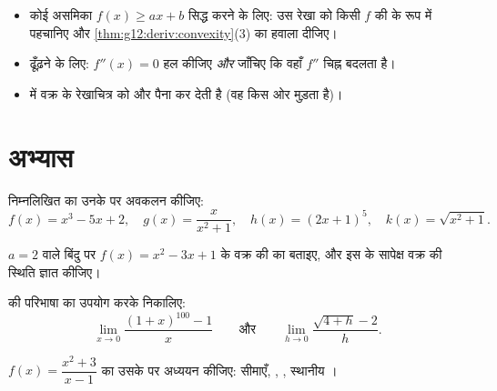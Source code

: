 \begin{method}\label{met:g12:deriv:convexity}
\begin{itemize}
  \item कोई असमिका $f(x) \geq ax + b$ सिद्ध करने के लिए: उस रेखा को किसी  $f$ की
         के रूप में पहचानिए और \cref{thm:g12:deriv:convexity}(3) का हवाला दीजिए।
  \item {} ढूँढ़ने के लिए: $f''(x) = 0$ हल कीजिए \emph{और} जाँचिए
        कि वहाँ $f''$ चिह्न बदलता है।
  \item {} में  वक्र के रेखाचित्र को और पैना कर देती है
        (वह किस ओर मुड़ता है)।
\end{itemize}
\end{method}

\section{अभ्यास}

\begin{exercise}[$\star$]\label{exo:g12:deriv:1}
निम्नलिखित  का उनके  पर अवकलन कीजिए:
\[
f(x) = x^3 - 5x + 2, \quad
g(x) = \frac{x}{x^2+1}, \quad
h(x) = (2x+1)^5, \quad
k(x) = \sqrt{x^2 + 1}.
\]
\end{exercise}

\begin{exercise}[$\star$]\label{exo:g12:deriv:2}
 $a = 2$ वाले बिंदु पर $f(x) = x^2 - 3x + 1$ के वक्र की  का  बताइए, और इस
 के सापेक्ष वक्र की स्थिति ज्ञात कीजिए।
\end{exercise}

\begin{exercise}[$\star$]\label{exo:g12:deriv:3}
 की परिभाषा का उपयोग करके निकालिए:
\[
\lim_{x \to 0} \frac{(1+x)^{100} - 1}{x}
\qquad\text{और}\qquad
\lim_{h \to 0} \frac{\sqrt{4+h} - 2}{h}.
\]
\end{exercise}

\begin{exercise}[$\star\star$]\label{exo:g12:deriv:4}
 $f(x) = \dfrac{x^2 + 3}{x - 1}$ का उसके  पर अध्ययन कीजिए: सीमाएँ, , ,
स्थानीय ।
\end{exercise}

